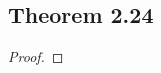 \documentclass[../../main.tex]{subfiles}
\begin{document}
\subsection{Theorem 2.24}
\begin{wts}

\end{wts}
\begin{proof}

\end{proof}
\end{document}
